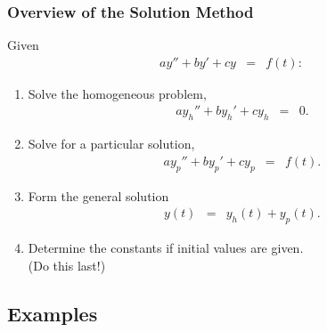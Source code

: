 \begin{frame}
  \frametitle{Overview of the Solution Method}

  Given
  \begin{eqnarray*}
    a y'' + by' + cy & = & f(t):
  \end{eqnarray*}
  \begin{enumerate}
  \item Solve the homogeneous problem,
    \begin{eqnarray*}
      a y_h'' + by_h' + cy_h & = & 0.
    \end{eqnarray*}
  \item Solve for a particular solution,
    \begin{eqnarray*}
      a y_p'' + by_p' + cy_p & = & f(t).
    \end{eqnarray*}
  \item Form the general solution
    \begin{eqnarray*}
      y(t) & = & y_h(t) + y_p(t).
    \end{eqnarray*}
  \item Determine the constants if initial values are given. \\
    (Do this last!)
  \end{enumerate}


\end{frame}

\subsection{Examples}

